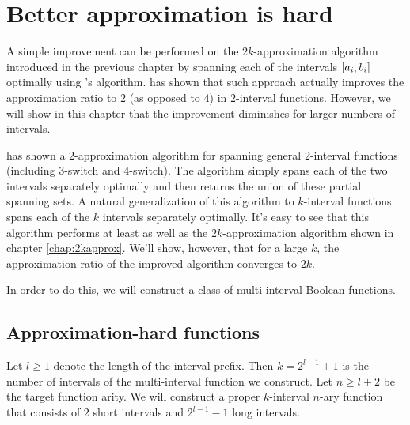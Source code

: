 \chapter{Better approximation is hard}

A simple improvement can be performed
on the $2k$-approximation algorithm introduced
in the previous chapter
by spanning each of the intervals
$[a_i, b_i]$ optimally
using \citeauthor{Schieber2005154}'s algorithm.
\citeauthor{Dubovsky2012} has shown that such approach
actually improves the approximation ratio to $2$
(as opposed to $4$)
in $2$-interval functions.
However,
we will show in this chapter that
the improvement diminishes for larger numbers of intervals.

\citeauthor{Dubovsky2012} has shown a $2$-approximation algorithm
for spanning general $2$-interval functions
(including $3$-switch and $4$-switch).\citep[p.~33]{Dubovsky2012}
The algorithm simply spans each of the two intervals
separately optimally and then returns the union
of these partial spanning sets.
A natural generalization of this algorithm to $k$-interval
functions spans each of the $k$ intervals separately
optimally.
It's easy to see that this algorithm performs
at least as well as the $2k$-approximation algorithm
shown in chapter \ref{chap:2kapprox}.
We'll show, however,
that for a large $k$,
the approximation ratio of the improved algorithm
converges to $2k$.

In order to do this,
we will construct a class of  multi-interval
Boolean functions.

\section{Approximation-hard functions}

Let $l \geq 1$
denote the length of the interval prefix.
Then $k = 2^{l-1} + 1$
is the number of intervals
of the multi-interval function we construct.
Let $n \geq l+2$ be the target function arity.
We will construct
a proper $k$-interval $n$-ary function
that consists of $2$ short intervals and $2^{l-1} - 1$
long intervals.

